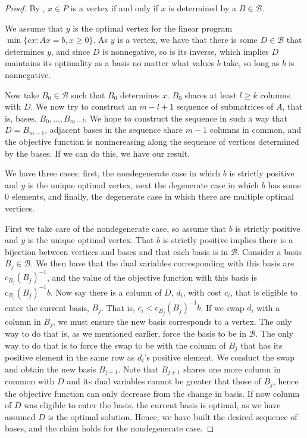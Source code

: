 \documentclass[11pt,a4paper]{article}
\theoremstyle{definition}
\begin{document}
\begin{proof}
By \citet{vein68}, $x\in P$ is a vertex if and only if $x$ is determined by a $B\in \mathcal{B}$.

We assume that $y$ is the optimal vertex for the linear program $\min\{ cx: Ax=b,x\ge 0\}$. As $y$ is a vertex, we have that there is some $D\in \mathcal{B}$ that determines $y$, and since $D$ is nonnegative, so is its inverse, which implies $D$ maintains its optimality as a basis no matter what values $b$ take, so long as $b$ is nonnegative.

Now take $B_0\in \mathcal{B}$ such that $B_0$ determines $x$. $B_0$ shares at least $l\ge k$ columns with $D$. We now try to construct an $m-l+1$ sequence of submatrices of $A$, that is, bases, $B_0,\ldots, B_{m-l}$. We hope to construct the sequence in such a way that $D=B_{m-1}$, adjacent bases in the sequence share $m-1$ columns in common, and the objective function is nonincreasing along the sequence of vertices determined by the bases. If we can do this, we have our result.

We have three cases: first, the nondegenerate case in which $b$ is strictly positive and $y$ is the unique optimal vertex, next the degenerate case in which $b$ has some 0 elements, and finally, the degenerate case in which there are multiple optimal vertices.

First we take care of the nondegenerate case, so assume that $b$ is strictly positive and $y$ is the unique optimal vertex. That $b$ is strictly positive implies there is a bijection between vertices and bases and that each basis is in $\mathcal{B}$. Consider a basis $B_j\in \mathcal{B}$. We then have that the dual variables corresponding with this basis are $c_{B_j}(B_j)^{-1}$, and the value of the objective function with this basis is $c_{B_j}(B_j)^{-1}b$. Now say there is a column of $D$, $d_i$, with cost $c_i$, that is eligible to enter the current basis, $B_j$. That is, $c_i<c_{B_j}(B_j)^{-1}b$. If we swap $d_i$ with a column in $B_j$, we must ensure the new basis corresponds to a vertex. The only way to do that is, as we mentioned earlier, force the basis to be in $\mathcal{B}$. The only way to do that is to force the swap to be with the column of $B_j$ that has its positive element in the same row as $d_i$'s positive element. We conduct the swap and obtain the new basis $B_{j+1}$. Note that $B_{j+1}$ shares one more column in common with $D$ and its dual variables cannot be greater that those of $B_j$, hence the objective function can only decrease from the change in basis. If now column of $D$ was eligible to enter the basis, the current basis is optimal, as we have assumed $D$ is the optimal solution. Hence, we have built the desired sequence of bases, and the claim holds for the nondegenerate case.


\end{proof}
\end{document}
